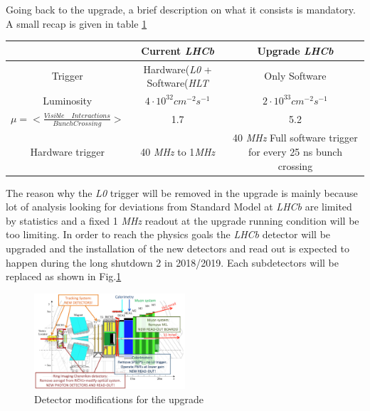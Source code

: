 \documentclass[paper=a4, fontsize=10pt]{scrartcl}
\numberwithin{equation}{section}		%
\numberwithin{figure}{section}			%
\numberwithin{table}{section}				%
\begin{document}
Going back to the upgrade, a brief description on what it consists is mandatory. A small recap is given in table \ref{table:runningCondition}
\begin{table}[h]
\centering
\begin{tabular}{|c|c|c|}
\hline
           & Current \textit{LHCb}          & Upgrade \textit{LHCb} \\ \hline
  Trigger    & Hardware(\textit{L0} + Software(\textit{HLT} & Only Software \\ \hline
Luminosity & $4 \cdot 10 ^{32} cm^{-2}s^{-1}$ & $2\cdot 10^{33} cm^{-2}s^{-1}$ \\ \hline
$\mu=< \frac{Visible \quad Interactions}{Bunch Crossing}>$ & 1.7 & 5.2 \\ \hline
Hardware trigger & 40 \textit{MHz} to 1\textit{MHz} & 40 \textit{MHz} Full software trigger for every 25 ns bunch crossing \\ \hline
\end{tabular}
\label{table:runningCondition}
\end{table}
The reason why the \textit{L0} trigger will be removed in the upgrade is mainly because lot of analysis looking for deviations from Standard Model at \textit{LHCb} are limited by statistics and a fixed 1 \textit{MHz} readout at the upgrade running condition will be too limiting. 
In order to reach the physics goals the \textit{LHCb} detector will be upgraded and the installation of the new detectors and read out is expected to happen during the long shutdown 2 in 2018/2019.
Each subdetectors will be replaced as shown in Fig.\ref{Fig:Upgrade}
\begin{figure}[h]
  \begin{center}
    \includegraphics[width=0.5\textwidth]{Images/Upgrade.png} 
  \caption[Caption for track type]{Detector modifications for the upgrade}
  \label{Fig:Upgrade}
  \end{center}
\end{figure}
\end{document}
